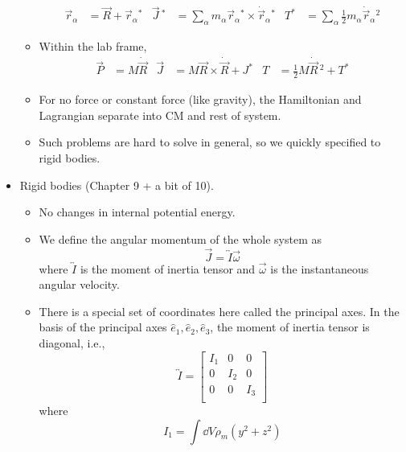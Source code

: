 \documentclass[../notes.tex]{subfiles}
\begin{document}
\begin{itemize}
\begin{itemize}
        \begin{align*}
            \vec{r}_\alpha &= \vec{R}+\vec{r}_\alpha{}^*&
            \vec{J}{\,}^* &= \sum_\alpha m_\alpha\vec{r}_\alpha{}^*\times\dot{\vec{r}}_\alpha{}^*&
            T^* &= \sum_\alpha\frac{1}{2}m_\alpha\dot{\vec{r}}_\alpha{}^2
        \end{align*}
        \item Within the lab frame,
        \begin{align*}
            \vec{P} &= M\dot{\vec{R}}&
            \vec{J} &= M\vec{R}\times\dot{\vec{R}}+J^*&
            T &= \frac{1}{2}M\dot{\vec{R}}{\,}^2+T^*
        \end{align*}
        \item For no force or constant force (like gravity), the Hamiltonian and Lagrangian separate into CM and rest of system.
        \item Such problems are hard to solve in general, so we quickly specified to rigid bodies.
    \end{itemize}
    \item Rigid bodies (Chapter 9 + a bit of 10).
    \begin{itemize}
        \item No changes in internal potential energy.
        \item We define the angular momentum of the whole system as
        \begin{equation*}
            \vec{J} = \overleftrightarrow{I}\vec{\omega}
        \end{equation*}
        where $\overleftrightarrow{I}$ is the moment of inertia tensor and $\vec{\omega}$ is the instantaneous angular velocity.
        \item There is a special set of coordinates here called the principal axes. In the basis of the principal axes $\hat{e}_1,\hat{e}_2,\hat{e}_3$, the moment of inertia tensor is diagonal, i.e.,
        \begin{equation*}
            \overleftrightarrow{I} =
            \begin{bmatrix}
                I_1 & 0 & 0\\
                0 & I_2 & 0\\
                0 & 0 & I_3\\
            \end{bmatrix}
        \end{equation*}
        where
        \begin{equation*}
            I_1 = \int\dd{V}\rho_m(y^2+z^2)

\end{equation*}
\end{itemize}
\end{itemize}
\end{document}
